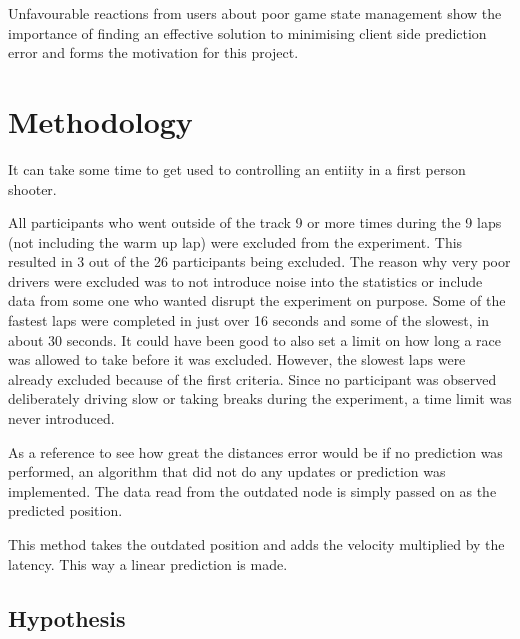 \documentclass[journal]{IEEEtran}
\begin{document}
Unfavourable reactions from users about poor game state management show the importance of finding an effective solution to minimising client side prediction error and forms the motivation for this project.



\section{Methodology}

It can take some time to get used to controlling an entiity in a first person shooter. 


All participants who went outside of the track 9 or more times during the 9 laps
(not including the warm up lap) were excluded from the experiment. This resulted
in 3 out of the 26 participants being excluded. The reason why very poor
drivers were excluded was to not introduce noise into the statistics or include
data from some one who wanted disrupt the experiment on purpose.
Some of the fastest laps were completed in just over 16 seconds and some of
the slowest, in about 30 seconds. It could have been good to also set a limit on
how long a race was allowed to take before it was excluded. However, the slowest
laps were already excluded because of the first criteria. Since no participant was
observed deliberately driving slow or taking breaks during the experiment, a time
limit was never introduced.

As a reference to see how great the distances error would be if no prediction
was performed, an algorithm that did not do any updates or prediction was
implemented. The data read from the outdated node is simply passed on as the
predicted position.

This method takes the outdated position and adds the velocity multiplied by the
latency. This way a linear prediction is made.

\subsection{Hypothesis}
\end{document}
